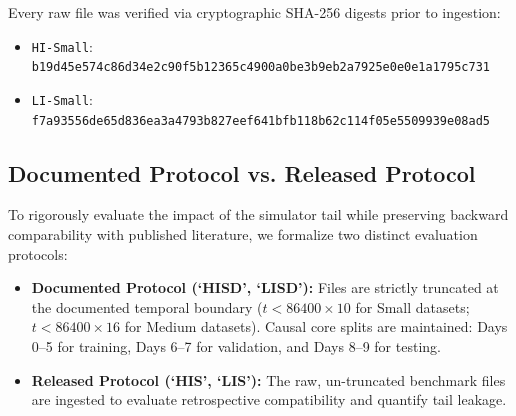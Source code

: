 \documentclass[11pt,a4paper]{article}
\begin{document}
\begin{table}[ht]
\centering
\small
\caption{\textbf{IBM AMLworld Benchmark Suite Dataset Specifications.}}
\label{tab:dataset_specs}
\end{table}

Every raw file was verified via cryptographic SHA-256 digests prior to ingestion:
\begin{itemize}[leftmargin=*]
    \item \texttt{HI-Small}: \texttt{b19d45e574c86d34e2c90f5b12365c4900a0be3b9eb2a7925e0e0e1a1795c731}
    \item \texttt{LI-Small}: \texttt{f7a93556de65d836ea3a4793b827eef641bfb118b62c114f05e5509939e08ad5}
\end{itemize}

\subsection{Documented Protocol vs. Released Protocol}
To rigorously evaluate the impact of the simulator tail while preserving backward comparability with published literature, we formalize two distinct evaluation protocols:
\begin{itemize}[leftmargin=*]
    \item \textbf{Documented Protocol (`HISD', `LISD'):} Files are strictly truncated at the documented temporal boundary ($t < 86400 \times 10$ for Small datasets; $t < 86400 \times 16$ for Medium datasets). Causal core splits are maintained: Days 0--5 for training, Days 6--7 for validation, and Days 8--9 for testing.
    \item \textbf{Released Protocol (`HIS', `LIS'):} The raw, un-truncated benchmark files are ingested to evaluate retrospective compatibility and quantify tail leakage.
\end{itemize}
\end{document}
